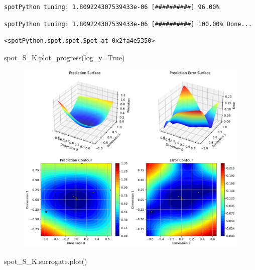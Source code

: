 \documentclass[
  letterpaper,
  DIV=11,
  numbers=noendperiod]{scrreprt}
\newenvironment{Shaded}{\begin{snugshade}}{\end{snugshade}}
\newcommand{\NormalTok}[1]{\textcolor[rgb]{0.00,0.23,0.31}{#1}}
\newcommand{\OperatorTok}[1]{\textcolor[rgb]{0.37,0.37,0.37}{#1}}
\newcommand{\VariableTok}[1]{\textcolor[rgb]{0.07,0.07,0.07}{#1}}
\begin{document}
\begin{verbatim}
spotPython tuning: 1.809224307539433e-06 [##########] 96.00% 
\end{verbatim}

\begin{verbatim}
spotPython tuning: 1.809224307539433e-06 [##########] 100.00% Done...
\end{verbatim}

\begin{verbatim}
<spotPython.spot.spot.Spot at 0x2fa4e5350>
\end{verbatim}

\begin{Shaded}
\begin{Highlighting}[]
\NormalTok{spot\_S\_K.plot\_progress(log\_y}\OperatorTok{=}\VariableTok{True}\NormalTok{)}
\end{Highlighting}
\end{Shaded}

\begin{figure}[H]

{\centering \includegraphics{012_num_spot_ei_files/figure-pdf/cell-40-output-1.pdf}

}

\end{figure}

\begin{Shaded}
\begin{Highlighting}[]
\NormalTok{spot\_S\_K.surrogate.plot()}
\end{Highlighting}
\end{Shaded}
\end{document}
